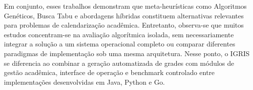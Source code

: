Em conjunto, esses trabalhos demonstram que meta-heurísticas como Algoritmos Genéticos, Busca Tabu e abordagens híbridas constituem alternativas relevantes para problemas de calendarização acadêmica. Entretanto, observa-se que muitos estudos concentram-se na avaliação algorítmica isolada, sem necessariamente integrar a solução a um sistema operacional completo ou comparar diferentes paradigmas de implementação sob uma mesma arquitetura. Nesse ponto, o IGRIS se diferencia ao combinar a geração automatizada de grades com módulos de gestão acadêmica, interface de operação e benchmark controlado entre implementações desenvolvidas em Java, Python e Go.
